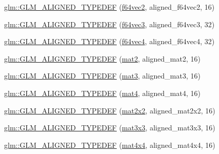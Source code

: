 \begin{DoxyCompactItemize}
\item 
\hyperlink{group__gtx__type__aligned_ga32814aa0f19316b43134fc25f2aad2b9}{glm\+::\+G\+L\+M\+\_\+\+A\+L\+I\+G\+N\+E\+D\+\_\+\+T\+Y\+P\+E\+D\+EF} (\hyperlink{group__gtc__type__precision_ga6c794781267fd5c810d9a6e7086e02a6}{f64vec2}, aligned\+\_\+f64vec2, 16)
\item 
\hyperlink{group__gtx__type__aligned_gaf3d3bbc1e93909b689123b085e177a14}{glm\+::\+G\+L\+M\+\_\+\+A\+L\+I\+G\+N\+E\+D\+\_\+\+T\+Y\+P\+E\+D\+EF} (\hyperlink{group__gtc__type__precision_ga659b65d8792f93da76c2da44f06e0b8b}{f64vec3}, aligned\+\_\+f64vec3, 32)
\item 
\hyperlink{group__gtx__type__aligned_ga804c654cead1139bd250f90f9bb01fad}{glm\+::\+G\+L\+M\+\_\+\+A\+L\+I\+G\+N\+E\+D\+\_\+\+T\+Y\+P\+E\+D\+EF} (\hyperlink{group__gtc__type__precision_ga41fb27973aedd37b7284789f2f997420}{f64vec4}, aligned\+\_\+f64vec4, 32)
\item 
\hyperlink{group__gtx__type__aligned_gafed7d010235a3aa7ea2f88646858f2ae}{glm\+::\+G\+L\+M\+\_\+\+A\+L\+I\+G\+N\+E\+D\+\_\+\+T\+Y\+P\+E\+D\+EF} (\hyperlink{group__core__types_ga8357ec0aab6f8cf69313592492663c3f}{mat2}, aligned\+\_\+mat2, 16)
\item 
\hyperlink{group__gtx__type__aligned_ga17f911ee7b78ca6d1b91c4ab51ddb73c}{glm\+::\+G\+L\+M\+\_\+\+A\+L\+I\+G\+N\+E\+D\+\_\+\+T\+Y\+P\+E\+D\+EF} (\hyperlink{group__core__types_gadfaff2a7dce5cbf4e77a47ecea42ac5b}{mat3}, aligned\+\_\+mat3, 16)
\item 
\hyperlink{group__gtx__type__aligned_ga31940e6012b72110e26fdb0f54805033}{glm\+::\+G\+L\+M\+\_\+\+A\+L\+I\+G\+N\+E\+D\+\_\+\+T\+Y\+P\+E\+D\+EF} (\hyperlink{group__core__types_ga7dcd2365c2e368e6af5b7adeb6a9c8df}{mat4}, aligned\+\_\+mat4, 16)
\item 
\hyperlink{group__gtx__type__aligned_ga01de96cd0b541c52d2b4a3faf65822e9}{glm\+::\+G\+L\+M\+\_\+\+A\+L\+I\+G\+N\+E\+D\+\_\+\+T\+Y\+P\+E\+D\+EF} (\hyperlink{group__core__types_gaeddc14adb4963d9bad73866cc202fb40}{mat2x2}, aligned\+\_\+mat2x2, 16)
\item 
\hyperlink{group__gtx__type__aligned_gac88a191b004bd341e64fc53b5a4d00e3}{glm\+::\+G\+L\+M\+\_\+\+A\+L\+I\+G\+N\+E\+D\+\_\+\+T\+Y\+P\+E\+D\+EF} (\hyperlink{group__core__types_ga6fecca6a869070b6bf8acb44ce1c2af3}{mat3x3}, aligned\+\_\+mat3x3, 16)
\item 
\hyperlink{group__gtx__type__aligned_gabe8c745fa2ced44a600a6e3f19991161}{glm\+::\+G\+L\+M\+\_\+\+A\+L\+I\+G\+N\+E\+D\+\_\+\+T\+Y\+P\+E\+D\+EF} (\hyperlink{group__core__types_ga63e3ee9447ed593484140a9368e738ec}{mat4x4}, aligned\+\_\+mat4x4, 16)

\end{DoxyCompactItemize}
